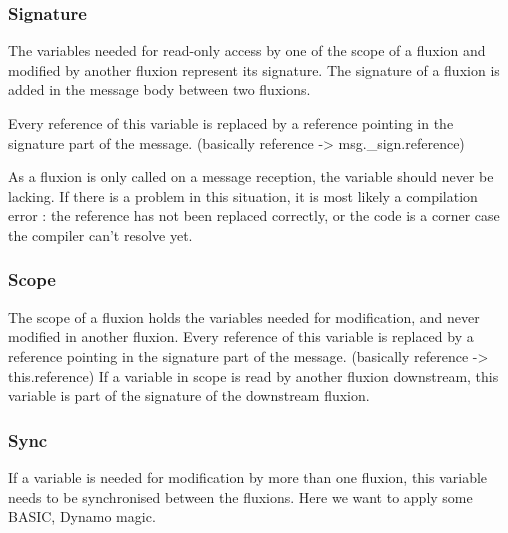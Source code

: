 \subsubsection{Signature}

  The variables needed for read-only access by one of the scope of a fluxion and modified by another fluxion represent its signature.
  The signature of a fluxion is added in the message body between two fluxions.

  Every reference of this variable is replaced by a reference pointing in the signature part of the message.
  (basically reference -> msg.\_sign.reference)

  As a fluxion is only called on a message reception, the variable should never be lacking.
  If there is a problem in this situation, it is most likely a compilation error : the reference has not been replaced correctly, or the code is a corner case the compiler can't resolve yet.

\subsubsection{Scope}

  The scope of a fluxion holds the variables needed for modification, and never modified in another fluxion.
  Every reference of this variable is replaced by a reference pointing in the signature part of the message.
  (basically reference -> this.reference)
  If a variable in scope is read by another fluxion downstream, this variable is part of the signature of the downstream fluxion.

\subsubsection{Sync}

  If a variable is needed for modification by more than one fluxion, this variable needs to be synchronised between the fluxions.
  Here we want to apply some BASIC, Dynamo magic.



